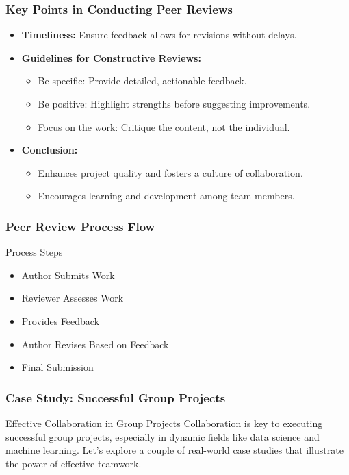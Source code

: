 \documentclass[aspectratio=169]{beamer}
\begin{document}
\begin{frame}[fragile]
    \frametitle{Key Points in Conducting Peer Reviews}
    \begin{itemize}
        \item \textbf{Timeliness:} Ensure feedback allows for revisions without delays.
        
        \item \textbf{Guidelines for Constructive Reviews:}
        \begin{itemize}
            \item Be specific: Provide detailed, actionable feedback.
            \item Be positive: Highlight strengths before suggesting improvements.
            \item Focus on the work: Critique the content, not the individual.
        \end{itemize}
        
        \item \textbf{Conclusion:} 
        \begin{itemize}
            \item Enhances project quality and fosters a culture of collaboration.
            \item Encourages learning and development among team members.
        \end{itemize}
    \end{itemize}
\end{frame}

\begin{frame}[fragile]
    \frametitle{Peer Review Process Flow}
    \begin{block}{Process Steps}
        \begin{itemize}
            \item Author Submits Work
            \item Reviewer Assesses Work
            \item Provides Feedback
            \item Author Revises Based on Feedback
            \item Final Submission
        \end{itemize}
    \end{block}
\end{frame}

\begin{frame}[fragile]
    \frametitle{Case Study: Successful Group Projects}
    \begin{block}{Effective Collaboration in Group Projects}
        Collaboration is key to executing successful group projects, especially in dynamic fields like data science and machine learning. 
        Let's explore a couple of real-world case studies that illustrate the power of effective teamwork.
    \end{block}
\end{frame}
\end{document}

